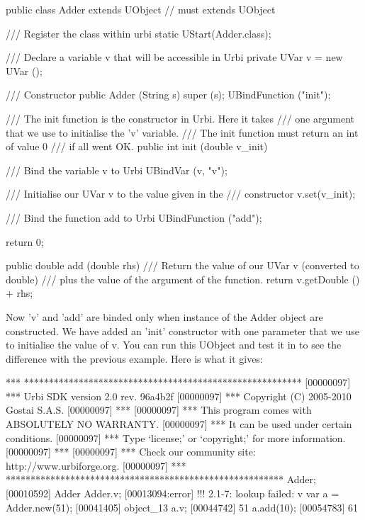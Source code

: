\begin{cxx}
public class Adder extends UObject // must extends UObject
{
    /// Register the class within urbi
    static { UStart(Adder.class); }

    /// Declare a variable v that will be accessible in Urbi
    private UVar v = new UVar ();

    /// Constructor
    public Adder (String s) {
    	super (s);
	UBindFunction ("init");
    }

    /// The init function is the constructor in Urbi. Here it takes
    /// one argument that we use to initialise the 'v' variable.
    /// The init function must return an int of value 0
    /// if all went OK.
    public int init (double v_init) {

	/// Bind the variable v to Urbi
	UBindVar (v, "v");

	/// Initialise our UVar v to the value given in the
	/// constructor
	v.set(v_init);

	/// Bind the function add to Urbi
	UBindFunction ("add");

	return 0;
    }

    public double add (double rhs) {
    	/// Return the value of our UVar v (converted to double)
    	/// plus the value of the argument of the function.
    	return v.getDouble () + rhs;
    }
}
\end{cxx}

Now 'v' and 'add' are binded only when instance of the Adder object are
constructed. We have added an 'init' constructor with one parameter that
we use to initialise the value of v. You can run this UObject and test
it in \urbi to see the difference with the previous example. Here is what
it gives:

\begin{cxx}
[00000097] *** ********************************************************
[00000097] *** Urbi SDK version 2.0 rev. 96a4b2f
[00000097] *** Copyright (C) 2005-2010 Gostai S.A.S.
[00000097] ***
[00000097] *** This program comes with ABSOLUTELY NO WARRANTY.
[00000097] *** It can be used under certain conditions.
[00000097] *** Type `license;' or `copyright;' for more information.
[00000097] ***
[00000097] *** Check our community site: http://www.urbiforge.org.
[00000097] *** ********************************************************
Adder;
[00010592] Adder
Adder.v;
[00013094:error] !!! 2.1-7: lookup failed: v
var a = Adder.new(51);
[00041405] object_13
a.v;
[00044742] 51
a.add(10);
[00054783] 61
\end{cxx}


